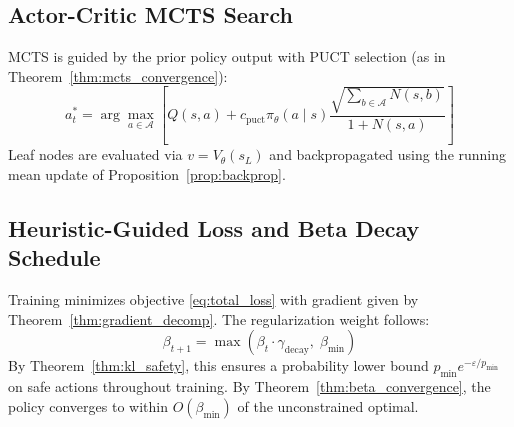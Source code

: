 \documentclass{article}
\begin{document}
\subsection{Actor-Critic MCTS Search}
MCTS is guided by the prior policy output with PUCT selection (as in Theorem~\ref{thm:mcts_convergence}):
\begin{equation}
    a_t^* = \arg\max_{a \in \mathcal{A}} \left[ Q(s, a) + c_{\mathrm{puct}} \pi_\theta(a \mid s) \frac{\sqrt{\sum_{b \in \mathcal{A}} N(s, b)}}{1 + N(s, a)} \right]
\end{equation}
Leaf nodes are evaluated via $v = V_\theta(s_L)$ and backpropagated using the running mean update of Proposition~\ref{prop:backprop}.

\subsection{Heuristic-Guided Loss and Beta Decay Schedule}
Training minimizes objective \eqref{eq:total_loss} with gradient given by Theorem~\ref{thm:gradient_decomp}. The regularization weight follows:
\begin{equation}
    \beta_{t+1} = \max(\beta_t \cdot \gamma_{\mathrm{decay}},\; \beta_{\min})
\end{equation}
By Theorem~\ref{thm:kl_safety}, this ensures a probability lower bound $p_{\min} e^{-\varepsilon/p_{\min}}$ on safe actions throughout training. By Theorem~\ref{thm:beta_convergence}, the policy converges to within $O(\beta_{\min})$ of the unconstrained optimal.
\end{document}
